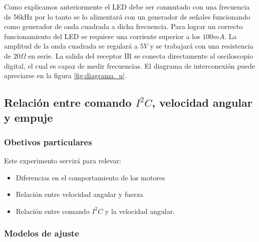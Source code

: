 \documentclass[main]{subfiles}
\begin{document}
Como explicamos anteriormente el LED debe ser conmutado con una frecuencia de 56kHz por lo tanto se lo alimentar\'a con un generador de se\~nales funcionando como generador de onda cuadrada a dicha frecuencia. Para lograr un correcto funcionamiento del LED se requiere una corriente superior a los $100mA$. La amplitud de la onda cuadrada se regular\'a a $5V$ y se trabajar\'a con una resistencia de $20\Omega$ en serie. La salida del receptor IR se conecta directamente al osciloscopio digital, el cual es capaz de medir frecuencias. El diagrama de interconexión puede apreciarse en la figura \ref{fig:diagrama_u}.\\

\subsection{Relaci\'on entre comando $I^2C$, velocidad angular y empuje}

\subsubsection*{Obetivos particulares}
Este experimento servir\'a para relevar:
\begin{itemize}
\item Diferencias en el comportamiento de los motores
\item Relaci\'on entre velocidad angular y fuerza
\item Relaci\'on entre comando $I^2C$ y la velocidad angular.
\end{itemize}

\subsubsection*{Modelos de ajuste}
\end{document}
